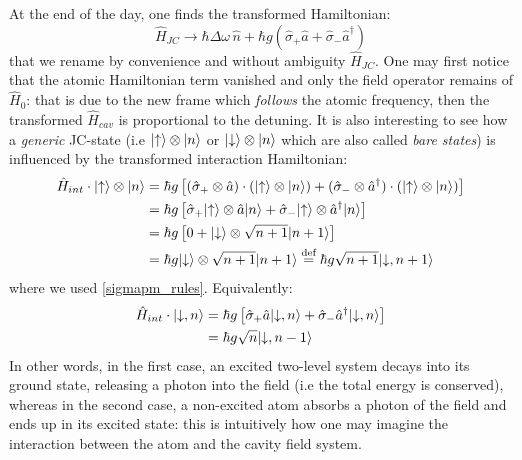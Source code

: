 \documentclass[11pt]{report}
\DeclarePairedDelimiter\ket{\lvert}{\rangle}
\begin{document}
At the end of the day, one finds the transformed Hamiltonian:
\begin{equation}
\label{HJC}
\hat{H}_{JC} \rightarrow \hbar\Delta\omega\,\hat{n} + \hbar g \left(\hat{\sigma}_+ \hat{a} + \hat{\sigma}_- \hat{a}^{\dag} \right)
\end{equation}
that we rename by convenience and without ambiguity $\hat{H}_{JC}$. One may first notice that the atomic Hamiltonian term vanished and only the field operator remains of $\hat{H}_0$: that is due to the new frame which \textit{follows} the atomic frequency, then the transformed $\hat{H}_{cav}$ is proportional to the detuning. It is also interesting to see how a \textit{generic} JC-state (i.e $\ket{\uparrow} \otimes \ket{n}$ or $\ket{\downarrow} \otimes \ket{n}$ which are also called \textit{bare states}) is influenced by the transformed interaction Hamiltonian:
\begin{align}
\hat{H}_{int} \cdot \ket{\uparrow} \otimes \ket{n} &= \hbar g \left[ (\hat{\sigma}_+ \otimes \hat{a}) \cdot (\ket{\uparrow} \otimes \ket{n}) + (\hat{\sigma}_- \otimes \hat{a}^{\dag}) \cdot (\ket{\uparrow} \otimes \ket{n}) \right]\\
&= \hbar g \left[ \hat{\sigma}_+\ket{\uparrow} \otimes \hat{a} \ket{n} + \hat{\sigma}_- \ket{\uparrow} \otimes \hat{a}^{\dag} \ket{n} \right]\\
&= \hbar g \left[ 0 + \ket{\downarrow} \otimes \sqrt{n+1}\ket{n+1} \right]\\
&= \hbar g \ket{\downarrow} \otimes \sqrt{n+1}\ket{n+1} \stackrel{\text{def}}{=} \hbar g \sqrt{n+1} \ket{\downarrow, n+1}
\end{align}
where we used \eqref{sigmapm_rules}. Equivalently:
\begin{align}
\hat{H}_{int} \cdot \ket{\downarrow, n} &= \hbar g \left[ \hat{\sigma}_+ \hat{a} \ket{\downarrow, n} + \hat{\sigma}_- \hat{a}^{\dag} \ket{\downarrow, n} \right]\\
&= \hbar g \sqrt{n} \ket{\downarrow, n-1}
\end{align}
In other words, in the first case, an excited two-level system decays into its ground state, releasing a photon into the field (i.e the total energy is conserved), whereas in the second case, a non-excited atom absorbs a photon of the field and ends up in its excited state: this is intuitively how one may imagine the interaction between the atom and the cavity field system.
\end{document}
